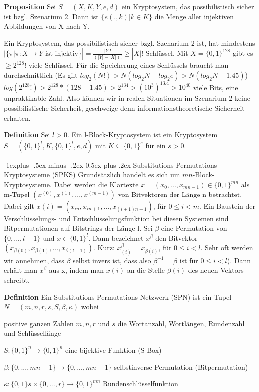 \documentclass[a4paper]{article}
\makeatletter
\renewcommand{\subsection}{\@startsection{subsection}{2}{0mm}%
 {-1explus -.5ex minus -.2ex}%
 {0.5ex plus .2ex}%
 {\normalfont\normalsize\bfseries}}
\makeatother
\begin{document}
\begin{multicols}{3}
    \textbf{Proposition} Sei $S=(X,K,Y,e,d)$ ein Kryptosystem, das possibilistisch sicher ist bzgl. Szenarium 2. Dann ist $\{e(.,k)|k\in K\}$ die Menge aller injektiven Abbildungen von X nach Y.

    Ein Kryptosystem, das possibilistisch sicher bzgl. Szenarium 2 ist, hat mindestens $|\{\pi |\pi :X\rightarrow Y\text{ ist injektiv}\}|=\frac{|Y|!}{(|Y|-|X|)!} \geq |X|!$ Schlüssel. Mit $X=\{0,1\}^{128}$ gibt es $\geq 2^{128}!$ viele Schlüssel. Für die Speicherung eines Schlüssels braucht man durchschnittlich (Es gilt $log_2(N!)>N(log_2 N-log_2 e)> N(log_2 N- 1.45)$) $log(2^{128}!)> 2^{128}*(128- 1.45)> 2^{134}>(10^3 )^{13.4} > 10^{40}$ viele Bits, eine unpraktikable Zahl. Also können wir in realen Situationen im Szenarium 2 keine possibilistische Sicherheit, geschweige denn informationstheoretische Sicherheit erhalten.

    \textbf{Definition} Sei $l>0$. Ein l-Block-Kryptosystem ist ein Kryptosystem $S=(\{0,1\}^l,K,\{0,1\}^l,e,d)$ mit $K\subseteq \{0,1\}^s$ für ein $s>0$.

    \subsection{Substitutions-Permutations-Kryptosysteme (SPKS)}
    Grundsätzlich handelt es sich um $mn$-Block-Kryptosysteme. Dabei werden die Klartexte $x=(x_0,...,x_{mn-1})\in\{ 0,1\}^{mn}$ als m-Tupel $(x^{(0)},x^{(1)},...,x^{(m-1)})$ von Bitvektoren der Länge n betrachtet. Dabei gilt $x(i)=(x_{in},x_{in+1},...,x_{(i+1)n-1})$, für $0\leq i<m$.
    Ein Baustein der Verschlüsselungs- und Entschlüsselungsfunktion bei diesen Systemen sind Bitpermutationen auf Bitstrings der Länge l. Sei $\beta$ eine Permutation von $\{0,...,l-1\}$ und $x\in\{0,1\}^l$. Dann bezeichnet $x^{\beta}$ den Bitvektor $(x_{{\beta}(0)},x_{{\beta}(1)},...,x_{{\beta}(l-1)})$.
    Kurz: $x^{\beta}_{(i)}=x_{{\beta}(i)}$, für $0\leq i<l$.
    Sehr oft werden wir annehmen, dass $\beta$ selbst invers ist, dass also ${\beta}^{-1}=\beta$ ist für $0\leq i<l$). Dann erhält man $x^{\beta}$ aus x, indem man $x(i)$ an die Stelle ${\beta}(i)$ des neuen Vektors schreibt.

    \textbf{Definition} Ein Substitutions-Permutations-Netzwerk (SPN) ist ein Tupel $N=(m,n,r,s,S,\beta,\kappa)$ wobei
    \begin{itemize*}
        \item positive ganzen Zahlen $m,n,r$ und $s$ die Wortanzahl, Wortlängen, Rundenzahl und Schlüssellänge
        \item $S:\{0,1\}^n\rightarrow\{0,1\}^n$ eine bijektive Funktion (S-Box)
        \item ${\beta}:\{0,...,mn-1\}\rightarrow\{0,...,mn-1\}$ selbstinverse Permutation (Bitpermutation)
        \item $\kappa :\{0,1\}s\times\{0,...,r\}\rightarrow\{0,1\}^{mn}$ Rundenschlüsselfunktion
    \end{itemize*}


\end{multicols}
\end{document}
